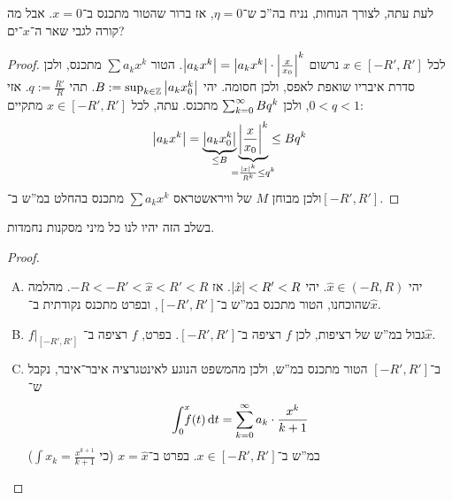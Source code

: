 \documentclass[]{../../../../tex/classes/styledArticle}
\begin{document}
	לעת עתה, לצורך הנוחות, נניח בה''כ ש־$\eta = 0$, אז ברור שהטור מתכנס ב־$x = 0$. אבל מה קורה לגבי שאר ה־$x$־ים? 
	\begin{proof}
		לכל $x \in [-R', R']$ נרשום $\left \lvert a_kx^{k} \right \rvert = \left \lvert a_kx^{k} \right \rvert\cdot \left \lvert \frac{x}{x_0} \right \rvert^{k}$. הטור $\sum a_kx^{k}$ מתכנס, ולכן סדרת איבריו שואפת לאפס, ולכן חסומה. יהי $B := \sup_{k \in \mathbb{Z}}\left \lvert a_kx_0^{k} \right \rvert$. תהי $q:=\frac{R'}{R}$. אזי $0 < q < 1$, ולכן $\sum_{k = 0}^{\infty} Bq^{k}$ מתכנס. עתה, לכל $x \in [-R', R']$ מתקיים: 
		\[ \sof{a_kx^{k}} = \underbrace{\sof{a_kx_0^{k}}}_{\le B}\underbrace{\sof{\frac{x}{x_0}}^{k}}_{\mathclap{=\frac{\sof x ^{k}}{R^{k}} \le q^{k}}} \le Bq^{k} \]
		ולכן מבוחן $M$ של וויראשטראס $\sum a_kx^{k}$ מתכנס בהחלט במ''ש ב־$[-R', R']$. 
	\end{proof}
	
	בשלב הזה יהיו לנו כל מיני מסקנות נחמדות. 
	\begin{proof}
		\begin{enumerate}[(A)]
			\item יהי $\hat x \in (-R, R)$. יהי $\left \lvert \hat x \right \rvert < R' < R$. אז $-R < -R' < \hat x < R ' < R$. מהלמה שהוכחנו, הטור מתכנס במ''ש ב־$[-R', R']$, ובפרט מתכנס נקודתית ב־$\hat x$. 
			\item $f|_{[-R', R']}$ גבול במ''ש של רציפות, לכן $f$ רציפה ב־$[-R', R']$. בפרט, $f$ רציפה ב־$\hat x$. 
			\item ב־$[-R', R']$ הטור מתכנס במ''ש, ולכן מהמשפט הנוגע לאינטגרציה איבר־איבר, נקבל ש־
			\[ \int^{x}_0 \!\!\!\!\!\! \ f(t)\,\mathrm{d}t = \sum_{k = 0}^{\infty} a_k \cdot \frac{x^{k}}{k + 1} \]
			במ''ש ב־$x \in [-R', R']$. בפרט ב־$x = \hat x$ (כי $\int x_k = \frac{x^{k + 1}}{k + 1}$)
		\end{enumerate}
	\end{proof}
	
\end{document}
